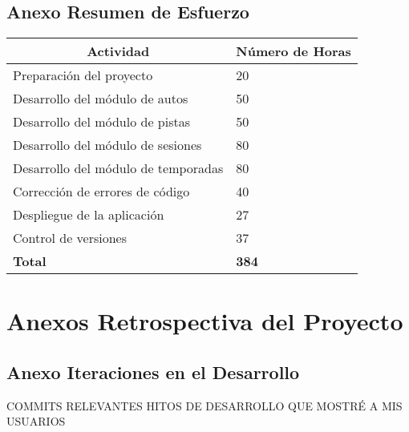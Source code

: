 \subsection{Anexo Resumen de Esfuerzo}
\begin{center}
  \begin{tabular}{ | p{10cm} | p{5cm} |}
    \hline
    \multicolumn{1}{|c|}{\textbf{Actividad}} & \multicolumn{1}{|c|}{\textbf{Número de Horas}} \\
    \hline
    
    {Preparación del proyecto} & {20} \\ \hline
    {Desarrollo del módulo de autos} & {50} \\ \hline
    {Desarrollo del módulo de pistas} & {50} \\ \hline
    {Desarrollo del módulo de sesiones} & {80} \\ \hline
    {Desarrollo del módulo de temporadas} & {80} \\ \hline
    {Corrección de errores de código} & {40} \\ \hline
    {Despliegue de la aplicación} & {27} \\ \hline
    {Control de versiones} & {37} \\ \hline
    
    {\textbf{Total}} & {\textbf{384}} \\

    \hline
  \end{tabular}
\end{center}

\section{Anexos Retrospectiva del Proyecto}

\subsection{Anexo Iteraciones en el Desarrollo}

COMMITS RELEVANTES HITOS DE DESARROLLO QUE MOSTRÉ A MIS USUARIOS
